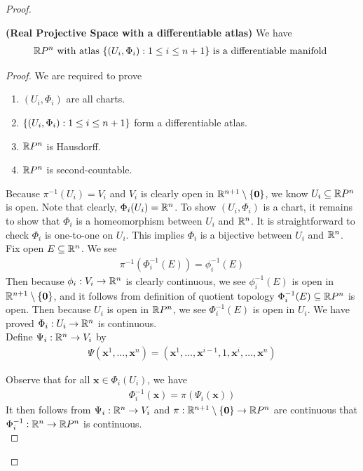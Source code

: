 \documentclass{report}
\begin{document}
\begin{proof}
\begin{mdframed}
\end{mdframed}
\begin{theorem}
\textbf{(Real Projective Space with a differentiable atlas)} We have
\begin{align*}
  \mathbb{R} P^n\text{ with atlas }\{ (U_i,\Phi_i):1\leq i\leq n+1 \}\text{ is a differentiable manifold }
\end{align*}
\end{theorem}
\begin{proof}
We are required to prove 
\begin{enumerate}[label=(\alph*)] 
  \item $(U_i,\Phi_i)$ are all charts. 
  \item $\{ (U_i,\Phi_i):1\leq i\leq n+1 \}$ form a differentiable atlas. 
\item $\mathbb{R} P^n$ is Hausdorff.
\item $\mathbb{R} P^n$ is second-countable. 
\end{enumerate}
 Because $\pi^{-1}(U_i)=V_i$ and $V_i$ is clearly open in $\mathbb{R}^{n+1}\setminus \{ \textbf{0} \}$, we know $U_i\subseteq \mathbb{R} P^n$ is open. Note that clearly,   $\Phi_i(U_i)=\mathbb{R}^n$. To show $(U_i,\Phi_i)$ is a chart, it remains to show that $\Phi_i$ is a homeomorphism between $U_i$ and  $\mathbb{R}^n$.  It is straightforward to check $\Phi_i$ is one-to-one on $U_i$. This implies $\Phi_i$ is a bijective between $U_i$ and  $\mathbb{R}^n$. \\


Fix open $E\subseteq \mathbb{R}^n$. We see 
\begin{align*}
  \pi^{-1}(\Phi_i^{-1}(E))=\phi_i^{-1}(E)
\end{align*}
Then because $\phi_i:V_i\rightarrow \mathbb{R}^n$ is clearly continuous, we see $\phi_i^{-1}(E)$ is open in $\mathbb{R}^{n+1}\setminus \{ \textbf{0} \}$, and it follows from definition of quotient topology  $\Phi_i^{-1}(E)\subseteq \mathbb{R} P^n$ is open. Then because $U_i$ is open in  $\mathbb{R} P^n$, we see $\Phi_i^{-1}(E)$ is open in $U_i$. We have proved  $\Phi_i:U_i\rightarrow \mathbb{R}^n$ is continuous.\\


Define $\Psi_i: \mathbb{R}^n\rightarrow V_i$ by 
\begin{align*}
\Psi (\textbf{x}^1,\dots ,\textbf{x}^n)= (\textbf{x}^1,\dots ,\textbf{x}^{i-1},1,\textbf{x}^i,\dots ,\textbf{x}^n)
\end{align*}



Observe that for all $\textbf{x}\in \Phi_i(U_i)$, we have
\begin{align*}
\Phi_i^{-1}(\textbf{x})= \pi(\Psi_i (\textbf{x}))
\end{align*}
It then follows from $\Psi_i:\mathbb{R}^n\rightarrow V_i$ and $\pi:\mathbb{R}^{n+1}\setminus \{ \textbf{0} \}\rightarrow \mathbb{R} P^n$ are continuous that $\Phi_i^{-1}:\mathbb{R}^n\rightarrow \mathbb{R} P^n$ is continuous.\\


\end{proof}
\end{proof}
\end{document}
